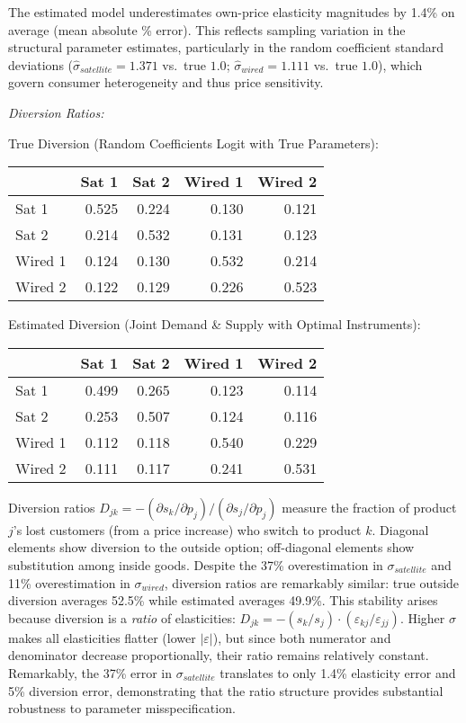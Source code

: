 \documentclass[english,11pt]{article}
\begin{document}
\begin{enumerate}
\begin{enumerate}
The estimated model underestimates own-price elasticity magnitudes by 1.4\% on average (mean absolute \% error). This reflects sampling variation in the structural parameter estimates, particularly in the random coefficient standard deviations ($\hat{\sigma}_{satellite} = 1.371$ vs.\ true $1.0$; $\hat{\sigma}_{wired} = 1.111$ vs.\ true $1.0$), which govern consumer heterogeneity and thus price sensitivity.

\textit{Diversion Ratios:}

True Diversion (Random Coefficients Logit with True Parameters):
\begin{center}
\begin{tabular}{lrrrr}
\hline
 & Sat 1 & Sat 2 & Wired 1 & Wired 2 \\
\hline
Sat 1 & 0.525 & 0.224 & 0.130 & 0.121 \\
Sat 2 & 0.214 & 0.532 & 0.131 & 0.123 \\
Wired 1 & 0.124 & 0.130 & 0.532 & 0.214 \\
Wired 2 & 0.122 & 0.129 & 0.226 & 0.523 \\
\hline
\end{tabular}
\end{center}

Estimated Diversion (Joint Demand \& Supply with Optimal Instruments):
\begin{center}
\begin{tabular}{lrrrr}
\hline
 & Sat 1 & Sat 2 & Wired 1 & Wired 2 \\
\hline
Sat 1 & 0.499 & 0.265 & 0.123 & 0.114 \\
Sat 2 & 0.253 & 0.507 & 0.124 & 0.116 \\
Wired 1 & 0.112 & 0.118 & 0.540 & 0.229 \\
Wired 2 & 0.111 & 0.117 & 0.241 & 0.531 \\
\hline
\end{tabular}
\end{center}

Diversion ratios $D_{jk} = -(\partial s_k/\partial p_j) / (\partial s_j/\partial p_j)$ measure the fraction of product $j$'s lost customers (from a price increase) who switch to product $k$. Diagonal elements show diversion to the outside option; off-diagonal elements show substitution among inside goods. Despite the 37\% overestimation in $\sigma_{satellite}$ and 11\% overestimation in $\sigma_{wired}$, diversion ratios are remarkably similar: true outside diversion averages 52.5\% while estimated averages 49.9\%. This stability arises because diversion is a \textit{ratio} of elasticities: $D_{jk} = -(s_k/s_j) \cdot (\varepsilon_{kj}/\varepsilon_{jj})$. Higher $\sigma$ makes all elasticities flatter (lower $|\varepsilon|$), but since both numerator and denominator decrease proportionally, their ratio remains relatively constant. Remarkably, the 37\% error in $\sigma_{satellite}$ translates to only 1.4\% elasticity error and 5\% diversion error, demonstrating that the ratio structure provides substantial robustness to parameter misspecification.


\end{enumerate}
\end{enumerate}
\end{document}
